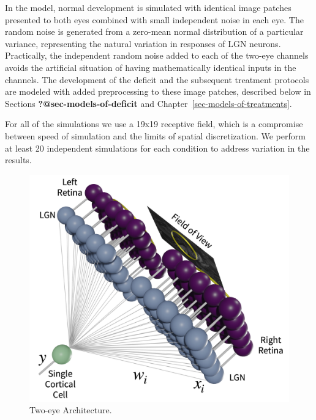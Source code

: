 \documentclass[
  letterpaper,
  number]{elsarticle}
\begin{document}
In the model, normal development is simulated with identical image
patches presented to both eyes combined with small independent noise in
each eye. The random noise is generated from a zero-mean normal
distribution of a particular variance, representing the natural
variation in responses of LGN neurons. Practically, the independent
random noise added to each of the two-eye channels avoids the artificial
situation of having mathematically identical inputs in the channels. The
development of the deficit and the subsequent treatment protocols are
modeled with added preprocessing to these image patches, described below
in Sections \textbf{?@sec-models-of-deficit} and
Chapter~\ref{sec-models-of-treatments}.

For all of the simulations we use a 19x19 receptive field, which is a
compromise between speed of simulation and the limits of spatial
discretization. We perform at least 20 independent simulations for each
condition to address variation in the results.

\begin{figure}

{\centering \includegraphics{./resources/arch.pdf}

}

\caption{\label{fig-arch}Two-eye Architecture.}

\end{figure}
\end{document}
